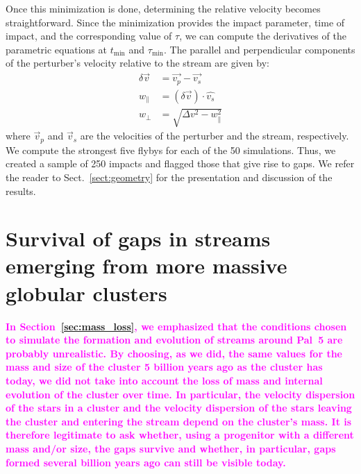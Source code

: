 \documentclass{aa}
\newcommand{\paola}[1]{\textcolor{magenta}{{#1}}}
\begin{document}
\begin{appendix}
      Once this minimization is done, determining the relative velocity becomes straightforward. Since the minimization provides the impact parameter, time of impact, and the corresponding value of $\tau$, we can compute the derivatives of the parametric equations at $t_{\text{min}}$ and $\tau_{\text{min}}$. The parallel and perpendicular components of the perturber's velocity relative to the stream are given by:
      \begin{equation}
        \begin{aligned}
          \delta \vec{v} &=\vec{v_p} - \vec{v_s} \\
          w_\parallel &= \left(\delta \vec{v}\right)\cdot \hat{v_s}\\  
          w_\perp &=  \sqrt{\Delta v ^2 - w_\parallel ^ 2}
          \end{aligned}
        \end{equation}
      where $\vec{v}_p$ and $\vec{v}_s$ are the velocities of the perturber and the stream, respectively. We compute the strongest five flybys for each of the 50 simulations. Thus, we created a sample of 250 impacts and flagged those that give rise to gaps. We refer the reader to Sect.~\ref{sect:geometry} for the presentation and discussion of the results.



\section{Survival of gaps in streams emerging from more massive globular clusters}\label{sec:gaps_vs_gcmass}

\textbf{\paola{In Section~\ref{sec:mass_loss}, we emphasized that the conditions chosen to simulate the formation and evolution of streams around Pal~5 are probably unrealistic. By choosing, as we did, the same values for the mass and size of the cluster 5 billion years ago as the cluster has today, we did not take into account the loss of mass and internal evolution of the cluster over time. In particular, the velocity dispersion of the stars in a cluster and the velocity dispersion of the stars leaving the cluster and entering the stream depend on the cluster's mass. It is therefore legitimate to ask whether, using a progenitor with a different mass and/or size, the gaps survive and whether, in particular, gaps formed several billion years ago can still be visible today. }}


\end{appendix}
\end{document}
